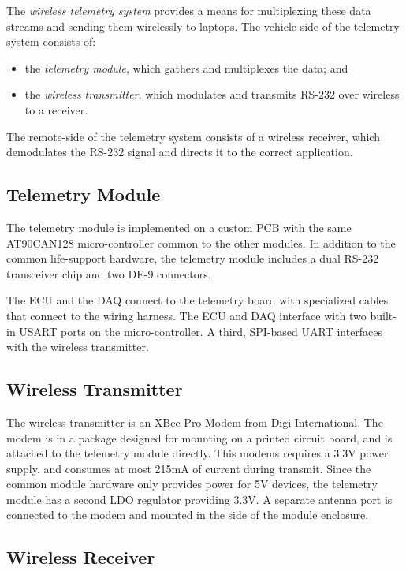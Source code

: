 The \emph{wireless telemetry system} provides a means for multiplexing these data streams and sending them wirelessly to laptops. The vehicle-side of the telemetry system consists of:

\begin{itemize}
\item the \emph{telemetry module}, which gathers and multiplexes the data; and
\item the \emph{wireless transmitter}, which modulates and transmits RS-232 over wireless to a receiver.
\end{itemize}

The remote-side of the telemetry system consists of a wireless receiver, which demodulates the RS-232 signal and directs it to the correct application.

\subsection{Telemetry Module}

The telemetry module is implemented on a custom PCB with the same AT90CAN128 micro-controller common to the other modules. In addition to the common life-support hardware, the telemetry module includes a dual RS-232 transceiver chip and two DE-9 connectors. 

The ECU and the DAQ connect to the telemetry board with specialized cables that connect to the wiring harness. The ECU and DAQ interface with two built-in USART ports on the micro-controller. A third, SPI-based UART interfaces with the wireless transmitter. 

\subsection{Wireless Transmitter}

The wireless transmitter is an XBee Pro Modem from Digi International. The modem is in a package designed for mounting on a printed circuit board, and is attached to the telemetry module directly. This modems requires a 3.3V power supply. and consumes at most 215mA of current during transmit. Since the common module hardware only provides power for 5V devices, the telemetry module has a second LDO regulator providing 3.3V. A separate antenna port is connected to the modem and mounted in the side of the module enclosure.

\subsection{Wireless Receiver}

